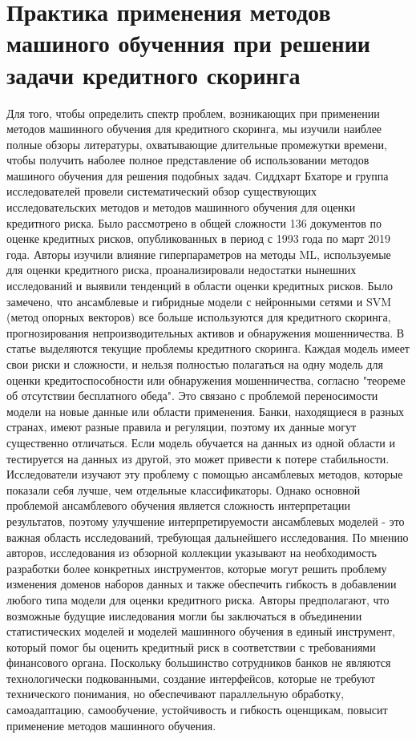 \documentclass[14pt, letterpaper, twoside]{extarticle}
\begin{document}
\section{Практика применения методов машиного обученния при решении задачи кредитного скоринга}
Для того, чтобы определить спектр проблем, возникающих при применении методов машинного обучения для кредитного скоринга, мы изучили наиблее полные обзоры литературы, охватывающие длительные промежутки времени, чтобы получить наболее полное представление об использовании методов машиного обучения для решения подобных задач. Сиддхарт Бхаторе и группа исследователей  \cite{bhatore2020machine} провели систематический обзор существующих исследовательских методов и методов машинного обучения для оценки кредитного риска. Было рассмотрено в общей сложности 136 документов по оценке кредитных рисков, опубликованных в период с 1993 года по март 2019 года. Авторы изучили влияние гиперпараметров на методы ML, используемые для оценки кредитного риска, проанализировали недостатки нынешних исследований и выявили тенденций в области оценки кредитных рисков. Было замечено, что ансамблевые и гибридные модели с нейронными сетями и SVM (метод опорных векторов) все больше используются для кредитного скоринга, прогнозирования непроизводительных активов и обнаружения мошенничества. В статье выделяются текущие проблемы кредитного скоринга. Каждая модель имеет свои риски и сложности, и нельзя полностью полагаться на одну модель для оценки кредитоспособности или обнаружения мошенничества, согласно "теореме об отсутствии бесплатного обеда". Это связано с проблемой переносимости модели на новые данные или области применения. Банки, находящиеся в разных странах, имеют разные правила и регуляции, поэтому их данные могут существенно отличаться. Если модель обучается на данных из одной области и тестируется на данных из другой, это может привести к потере стабильности. Исследователи изучают эту проблему с помощью ансамблевых методов, которые показали себя лучше, чем отдельные классификаторы. Однако основной проблемой ансамблевого обучения является сложность интерпретации результатов, поэтому улучшение интерпретируемости ансамблевых моделей - это важная область исследований, требующая дальнейшего исследования. По мнению авторов, исследования из обзорной коллекции указывают на необходимость разработки более конкретных инструментов, которые могут решить проблему изменения доменов наборов данных и также обеспечить гибкость в добавлении любого типа модели для оценки кредитного риска. Авторы предполагают, что возможные будущие ииследования могли бы заключаться в объединении статистических моделей и моделей машинного обучения в единый инструмент, который помог бы оценить кредитный риск в соответствии с требованиями финансового органа. Поскольку большинство сотрудников банков не являются технологически подкованными, создание интерфейсов, которые не требуют технического понимания, но обеспечивают параллельную обработку, самоадаптацию, самообучение, устойчивость и гибкость оценщикам, повысит применение методов машинного обучения.\\
\end{document}
